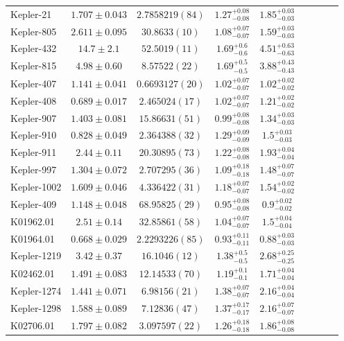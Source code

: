 \documentclass[a4paper,fleqn,usenatbib]{mnras}
\begin{document}
\begin{table*}
\begin{tabular}{lcccccccc}
Kepler-21&	$1.707 \pm 0.043$	&$ 2.7858219 (84)$     	&$1.27^{+0.08}_{-0.08}$	&$1.85^{+0.03}_{-0.03}$	&\\
Kepler-805&	$2.611 \pm 0.095$	&$30.8633 (10)$       	&$1.08^{+0.07}_{-0.07}$	&$1.59^{+0.03}_{-0.03}$	&\\
Kepler-432&	$14.7 \pm 2.1$  	&$52.5019 (11)$        	&$1.69^{+0.6}_{-0.6}$	&$4.51^{+0.63}_{-0.63}$	&\\
Kepler-815&	$4.98 \pm 0.60$ 	&$ 8.57522 (22)$       	&$1.69^{+0.5}_{-0.5}$	&$3.88^{+0.43}_{-0.43}$	&\\
Kepler-407&	$1.141 \pm 0.041$	&$ 0.6693127 (20)$	    &$1.02^{+0.07}_{-0.07}$	&$1.02^{+0.02}_{-0.02}$	&\\
Kepler-408&	$0.689 \pm 0.017$	&$ 2.465024 (17)$	    &$1.02^{+0.07}_{-0.07}$	&$1.21^{+0.02}_{-0.02}$	&\\
Kepler-907&	$1.403 \pm 0.081$	&$15.86631 (51)$	    &$0.99^{+0.08}_{-0.08}$	&$1.34^{+0.03}_{-0.03}$	&\\
Kepler-910&	$0.828 \pm 0.049$	&$ 2.364388 (32)$	    &$1.29^{+0.09}_{-0.09}$	&$1.5^{+0.03}_{-0.03}$	&\\
Kepler-911&	$2.44 \pm 0.11$ 	&$20.30895 (73)$       	&$1.22^{+0.08}_{-0.08}$	&$1.93^{+0.04}_{-0.04}$	&\\
Kepler-997&	$1.304 \pm 0.072$	&$ 2.707295 (36)$       &$1.09^{+0.18}_{-0.18}$	&$1.48^{+0.07}_{-0.07}$	&\\
Kepler-1002&$1.609 \pm 0.046$	&$ 4.336422 (31)$     	&$1.18^{+0.07}_{-0.07}$	&$1.54^{+0.02}_{-0.02}$	&\\
Kepler-409&	$1.148 \pm 0.048$	&$68.95825 (29)$      	&$0.95^{+0.08}_{-0.08}$	&$0.9^{+0.02}_{-0.02}$	&\\
K01962.01&	$2.51 \pm 0.14$  	&$32.85861 (58)$       	&$1.04^{+0.07}_{-0.07}$	&$1.5^{+0.04}_{-0.04}$	&\\
K01964.01&	$0.668 \pm 0.029$	&$ 2.2293226 (85)$     	&$0.93^{+0.11}_{-0.11}$	&$0.88^{+0.03}_{-0.03}$	&\\
Kepler-1219&$3.42 \pm 0.37$ 	&$16.1046 (12)$        	&$1.38^{+0.5}_{-0.5}$	&$2.68^{+0.25}_{-0.25}$	&\\
K02462.01&	$1.491 \pm 0.083$	&$12.14533 (70)$        &$1.19^{+0.1}_{-0.1}$	&$1.71^{+0.04}_{-0.04}$	&\\
Kepler-1274&$1.441 \pm 0.071$	&$ 6.98156 (21)$	     &$1.38^{+0.07}_{-0.07}$	&$2.16^{+0.04}_{-0.04}$	&\\
Kepler-1298&$1.588 \pm 0.089$	&$ 7.12836 (47)$	     &$1.37^{+0.17}_{-0.17}$	&$2.16^{+0.07}_{-0.07}$	&\\
K02706.01&	$1.797 \pm 0.082$	&$ 3.097597 (22)$	     &$1.26^{+0.18}_{-0.18}$	&$1.86^{+0.08}_{-0.08}$	&\\

\end{tabular}
\end{table*}
\end{document}
